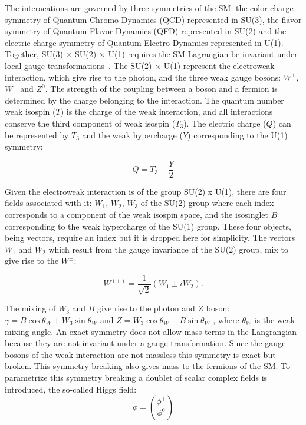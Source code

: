 The interacations are governed by three symmetries of the SM: the color charge 
symmetry of Quantum Chromo Dynamics (QCD) represented in SU(3), the flavor 
symmetry of Quantum Flavor Dynamics (QFD) represented in SU(2) and the electric 
charge symmetry of Quantum Electro Dynamics represented in U(1). Together, SU(3) 
$\times$  SU(2) $\times$ U(1) requires the SM Lagrangian be invariant under 
local gauge transformations~\cite{perkins2000introduction}. The SU(2) $\times$ U(1) represent the electroweak interaction, 
which give rise to the photon, and the three weak gauge bosons: $W^{+}$, $W^{-}$ and $Z^0$.
The strength of the coupling between a boson and a fermion is determined by the 
charge belonging to the interaction. The quantum number weak isospin ($T$) is the charge 
of the weak interaction, and all interactions conserve the third component of weak isospin ($T_{3}$).
The electric charge ($Q$) can be represented by $T_{3}$ and the weak hypercharge ($Y$) 
corresponding to the U(1) symmetry:

\begin{equation}
\label{eq:Q-charge}
Q = T_{3} + \frac{Y}{2}
\end{equation}

Given the electroweak interaction is of the group SU(2) x U(1), there are four fields associated 
with it: $W_{1}$, $W_{2}$, $W_{3}$ of the SU(2) group where each index
corresponds to a component of the weak isospin space, and the isosinglet $B$ corresponding
to the weak hypercharge of the SU(1) group. These four objects, being vectors, require an index but it 
is dropped here for simplicity. The vectors $W_{1}$ and $W_{2}$ which result from the 
gauge invariance of the SU(2) group, mix to give rise to the $W^{\pm}$:

\begin{equation}
\label{eq:vector-boson}
W^{\left(\pm\right)}= \frac{1}{\sqrt{2}}\left(W_{1} \pm iW_{2}\right).
\end{equation}

The mixing of $W_{3}$ and $B$ give rise to the photon and $Z$ boson: 
$\gamma = B \cos \theta_W + W_{3} \sin \theta_W$  and $Z = W_{3}\cos \theta_W - B \sin \theta_W$ ,
where $\theta_W$ is the weak mixing angle. An exact symmetry does not allow mass 
terms in the Langrangian because they are not invariant under a gauge transformation. 
Since the gauge bosons of the weak interaction are not massless this symmetry is exact 
but broken. This symmetry breaking also gives mass to the fermions of the SM. To 
parametrize this symmetry breaking a doublet of scalar complex fields is introduced, the so-called
Higgs field:
\begin{equation}
\label{eq:higgs-field}
\phi = \binom{\phi^{+}}{\phi^{0}}
\end{equation}

